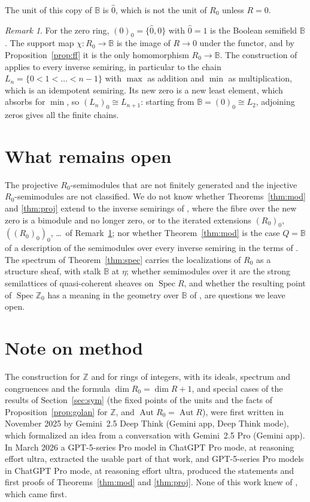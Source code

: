 \documentclass[11pt]{amsart}
\theoremstyle{remark}
\newtheorem{remark}[thm]{Remark}
\newcommand{\B}{\mathbb B}
\newcommand{\oz}{\widehat{0}}
\DeclareMathOperator{\Spec}{Spec}
\begin{document}
The unit of this copy of $\B$ is $\oz$, which is not the unit of $R_0$ unless $R=0$.

\begin{remark}\label{rem:chains}
For the zero ring, $(0)_0=\{\oz,0\}$ with $\oz=1$ is the Boolean semifield $\B$. The support map $\chi\colon R_0\to\B$ is the image of $R\to0$ under the functor, and by Proposition~\ref{prop:ff} it is the only homomorphism $R_0\to\B$. The construction of \cite[Definition 3.6]{FGJM} applies to every inverse semiring, in particular to the chain $L_n=\{0<1<\dots<n-1\}$ with $\max$ as addition and $\min$ as multiplication, which is an idempotent semiring. Its new zero is a new least element, which absorbs for $\min$, so $(L_n)_0\cong L_{n+1}$: starting from $\B=(0)_0\cong L_2$, adjoining zeros gives all the finite chains.
\end{remark}

\section{What remains open}
The projective $R_0$-semimodules that are not finitely generated and the injective $R_0$-semimodules are not classified. We do not know whether Theorems~\ref{thm:mod} and \ref{thm:proj} extend to the inverse semirings of \cite[Construction 3.5]{FGJM}, where the fibre over the new zero is a bimodule and no longer zero, or to the iterated extensions $(R_0)_0$, $((R_0)_0)_0$, \dots\ of Remark~\ref{rem:chains}; nor whether Theorem~\ref{thm:mod} is the case $Q=\B$ of a description of the semimodules over every inverse semiring in the terms of \cite[Theorem~8.5]{CFMM}. The spectrum of Theorem~\ref{thm:spec} carries the localizations of $R_0$ as a structure sheaf, with stalk $\B$ at $\eta$; whether semimodules over it are the strong semilattices of quasi-coherent sheaves on $\Spec R$, and whether the resulting point of $\Spec\mathbb Z_0$ has a meaning in the geometry over $\B$ of \cite{CC}, are questions we leave open.

\section*{Note on method}
The construction for $\mathbb Z$ and for rings of integers, with its ideals, spectrum and congruences and the formula $\dim R_0=\dim R+1$, and special cases of the results of Section~\ref{sec:sym} (the fixed points of the units and the facts of Proposition~\ref{prop:golan} for $\mathbb Z$, and $\operatorname{Aut}R_0=\operatorname{Aut}R$), were first written in November 2025 by Gemini~2.5 Deep Think (Gemini app, Deep Think mode), which formalized an idea from a conversation with Gemini~2.5 Pro (Gemini app). In March 2026 a GPT-5-series Pro model in ChatGPT Pro mode, at reasoning effort ultra, extracted the usable part of that work, and GPT-5-series Pro models in ChatGPT Pro mode, at reasoning effort ultra, produced the statements and first proofs of Theorems~\ref{thm:mod} and \ref{thm:proj}. None of this work knew of \cite{FGJM}, which came first.
\end{document}
